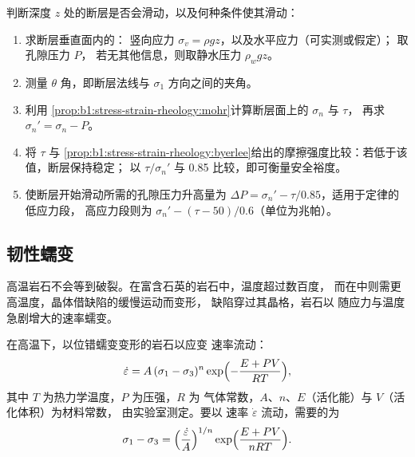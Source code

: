 \begin{method}[检验断层是否滑动]\label{met:b1:stress-strain-rheology:slip-test}
判断深度 $z$ 处的断层是否会滑动，以及何种条件使其滑动：
\begin{enumerate}
  \item 求断层垂直面内的：
        竖向应力 $\sigma_v = \rho g z$，以及水平应力（可实测或假定）；
        取孔隙压力 $P$，
        若无其他信息，则取静水压力 $\rho_w g z$。
  \item 测量 $\theta$ 角，即断层法线与
        $\sigma_1$ 方向之间的夹角。
  \item 利用
        \cref{prop:b1:stress-strain-rheology:mohr}计算断层面上的 $\sigma_n$ 与 $\tau$，
        再求 $\sigma_n' = \sigma_n - P$。
  \item 将 $\tau$ 与
        \cref{prop:b1:stress-strain-rheology:byerlee}给出的摩擦强度比较：若低于该值，断层保持稳定；
        以 $\tau/\sigma_n'$ 与 0.85 比较，即可衡量安全裕度。
  \item 使断层开始滑动所需的孔隙压力升高量为
        $\Delta P = \sigma_n' - \tau/0.85$，适用于定律的低应力段，
        高应力段则为 $\sigma_n' - (\tau - 50)/0.6$（单位为兆帕）。
\end{enumerate}
\end{method}

\subsection*{韧性蠕变}

高温岩石不会等到破裂。在富含石英的岩石中，温度超过数百度，
而在中则需更高温度，晶体借缺陷的缓慢运动而变形，
缺陷穿过其晶格，岩石以
随应力与温度急剧增大的速率蠕变。

\begin{proposition}[幂律蠕变]\label{prop:b1:stress-strain-rheology:creep}
在高温下，以位错蠕变变形的岩石以应变
速率流动：
\[
  \dot\varepsilon = A\,(\sigma_1 - \sigma_3)^n \exp\Bigl(-\frac{E + PV}{RT}\Bigr),
\]
其中 $T$ 为热力学温度，$P$ 为压强，$R$ 为
气体常数，$A$、$n$、$E$（活化能）与 $V$（活化体积）为材料常数，
由实验室测定。要以
速率 $\dot\varepsilon$ 流动，需要的为
\[
  \sigma_1 - \sigma_3 = \Bigl(\frac{\dot\varepsilon}{A}\Bigr)^{1/n}
  \exp\Bigl(\frac{E + PV}{nRT}\Bigr).
\]
\end{proposition}
\admitted

